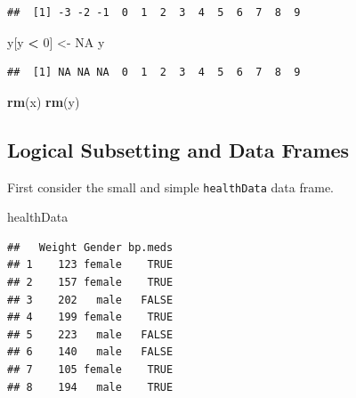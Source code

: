 \documentclass[
]{krantz}
\newenvironment{Shaded}{\begin{snugshade}}{\end{snugshade}}
\newcommand{\DecValTok}[1]{\textcolor[rgb]{0.00,0.00,0.81}{#1}}
\newcommand{\KeywordTok}[1]{\textcolor[rgb]{0.13,0.29,0.53}{\textbf{#1}}}
\newcommand{\NormalTok}[1]{#1}
\newcommand{\OperatorTok}[1]{\textcolor[rgb]{0.81,0.36,0.00}{\textbf{#1}}}
\newcommand{\OtherTok}[1]{\textcolor[rgb]{0.56,0.35,0.01}{#1}}
\newcommand{\StringTok}[1]{\textcolor[rgb]{0.31,0.60,0.02}{#1}}
\begin{document}
\begin{verbatim}
##  [1] -3 -2 -1  0  1  2  3  4  5  6  7  8  9
\end{verbatim}

\begin{Shaded}
\begin{Highlighting}[]
\NormalTok{y[y }\OperatorTok{\textless{}}\StringTok{ }\DecValTok{0}\NormalTok{] \textless{}{-}}\StringTok{ }\OtherTok{NA}
\NormalTok{y}
\end{Highlighting}
\end{Shaded}

\begin{verbatim}
##  [1] NA NA NA  0  1  2  3  4  5  6  7  8  9
\end{verbatim}

\begin{Shaded}
\begin{Highlighting}[]
\KeywordTok{rm}\NormalTok{(x)}
\KeywordTok{rm}\NormalTok{(y)}
\end{Highlighting}
\end{Shaded}

\hypertarget{logical-subsetting-and-data-frames}{%
\subsection{Logical Subsetting and Data Frames}\label{logical-subsetting-and-data-frames}}

First consider the small and simple \texttt{healthData} data frame.

\begin{Shaded}
\begin{Highlighting}[]
\NormalTok{healthData}
\end{Highlighting}
\end{Shaded}

\begin{verbatim}
##   Weight Gender bp.meds
## 1    123 female    TRUE
## 2    157 female    TRUE
## 3    202   male   FALSE
## 4    199 female    TRUE
## 5    223   male   FALSE
## 6    140   male   FALSE
## 7    105 female    TRUE
## 8    194   male    TRUE
\end{verbatim}

\begin{Shaded}
\end{Shaded}
\end{document}
